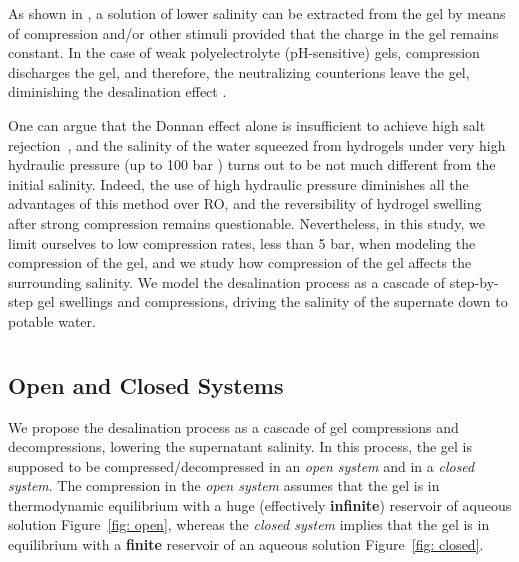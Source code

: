 \documentclass[gels,article,accept,pdftex,moreauthors]{Definitions/mdpi}
\newcommand{\reffig}[1]{Figure~\ref{#1}}
\begin{document}
As shown in \cite{Li2011, Ali2015, Arens_2017, Fengler_2020}, a solution of lower salinity can be extracted from the gel by means of compression and/or other stimuli provided that the charge in the gel remains constant.
In the case of weak polyelectrolyte (pH-sensitive) gels, compression discharges the gel, and therefore, the neutralizing counterions leave the gel, diminishing the desalination effect \cite{Rud2018}.

One can argue that the Donnan effect alone is insufficient to achieve high salt rejection~\cite{Cai2016}, and the salinity of the water squeezed from hydrogels under very high hydraulic pressure (up to 100 bar \cite{Fengler_2020}) turns out to be not much different from the initial salinity.
Indeed, the use of high hydraulic pressure diminishes all the advantages of this method over RO, and the reversibility of hydrogel swelling after strong compression remains questionable.
Nevertheless, in this study, we limit ourselves to low compression rates, less than 5 bar, when modeling the compression of the gel, and we study how compression of the gel affects the surrounding salinity.
We model the desalination process as a cascade of step-by-step gel swellings and compressions, driving the salinity of the supernate down to potable water.

\section{ %
\label{sec: theory}}



\subsection{Open and Closed Systems}


We propose the desalination process as a cascade of gel compressions and decompressions, lowering the  supernatant salinity.
In this process, the gel is supposed to be compressed/decompressed in an \emph{open system %
} and in a \emph{closed system}.
The compression in the \emph{open system} assumes that the gel is in thermodynamic equilibrium with a huge (effectively \textbf{infinite}) reservoir of aqueous solution \reffig{fig: open}, whereas 
the \emph{closed system} implies that the gel is in equilibrium with a \textbf{finite %
} reservoir of an aqueous solution \reffig{fig: closed}.  
\end{document}
